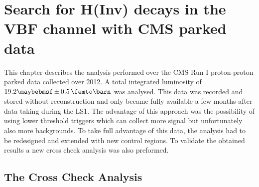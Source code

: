 \chapter{Search for H(Inv) decays in the VBF channel with CMS parked data}
\label{CHAPTER:ParkedDataAnalysis}


%
%
%
%
%
%
%


This chapter describes the analysis performed over the \gls{CMS} Run I proton-proton parked data collected over 2012. A total integrated luminosity of $19.2 \pm 0.5\,\femto\barn$ was analysed. This data was recorded and stored without reconstruction and only became fully available a few months after data taking during the \gls{LS1}. The advantage of this approach was the possibility of using lower threshold triggers which can collect more signal but unfortunately also more backgrounds. To take full advantage of this data, the analysis had to be redesigned and extended with new control regions. To validate the obtained results a new cross check analysis was also preformed.

\section{The Cross Check Analysis}
\label{CHAPTER:ParkedDataAnalysis_CrossCheckAnalysis}


